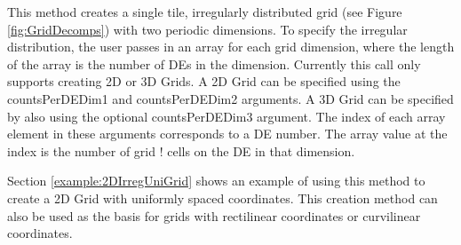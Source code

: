   
   This method creates a single tile, irregularly distributed grid
   (see Figure \ref{fig:GridDecomps}) with two periodic dimensions.
   To specify the irregular distribution, the user passes in an array
   for each grid dimension, where the length of the array is the number
   of DEs in the dimension. Currently this call only
   supports creating 2D or 3D Grids. A 2D Grid can be specified using the
   countsPerDEDim1 and countsPerDEDim2 arguments.  A 3D Grid can
   be specified by also using the optional countsPerDEDim3 argument.
   The index of each array element in these arguments corresponds to
   a DE number.  The array value at the index is the number of grid
  ! cells on the DE in that dimension.
  
   Section \ref{example:2DIrregUniGrid} shows an example
   of using this method to create a 2D Grid with uniformly spaced
   coordinates.  This creation method can also be used as the basis for
   grids with rectilinear coordinates or curvilinear coordinates.
  
